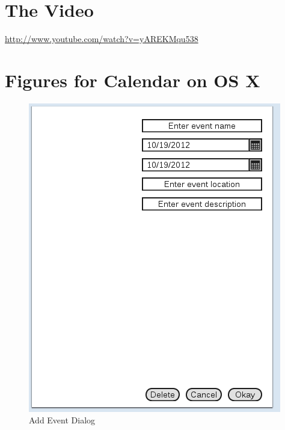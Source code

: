 \documentclass{article}
\begin{document}

\section{The Video}

\url{http://www.youtube.com/watch?v=yAREKMqu538}


\appendix

\section{Figures for Calendar on OS X}

\begin{figure}[hb]
\centering
\includegraphics[scale=0.7]{CMCLGDREvent.png}
\caption{Add Event Dialog}
\label{fig:addevent}
\end{figure}
\end{document}
